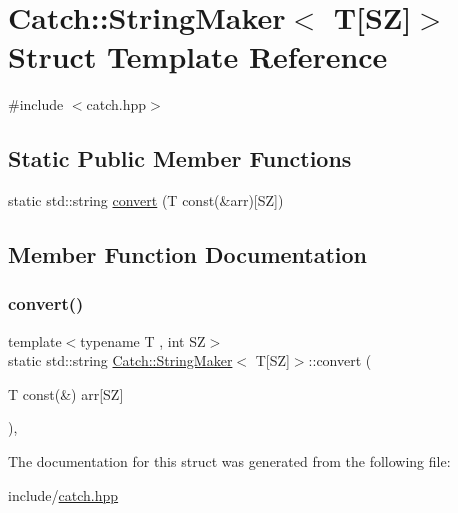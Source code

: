 \hypertarget{struct_catch_1_1_string_maker_3_01_t[_s_z]_4}{}\section{Catch\+::String\+Maker$<$ T\mbox{[}SZ\mbox{]}$>$ Struct Template Reference}
\label{struct_catch_1_1_string_maker_3_01_t[_s_z]_4}


{\ttfamily \#include $<$catch.\+hpp$>$}

\subsection*{Static Public Member Functions}
\begin{DoxyCompactItemize}
\item 
static std\+::string \mbox{\hyperlink{struct_catch_1_1_string_maker_3_01_t[_s_z]_4_a3698cea2c24d8649ec9ecb5fa679eeb7}{convert}} (T const(\&arr)\mbox{[}SZ\mbox{]})
\end{DoxyCompactItemize}


\subsection{Member Function Documentation}
\mbox{\label{struct_catch_1_1_string_maker_3_01_t[_s_z]_4_a3698cea2c24d8649ec9ecb5fa679eeb7}} 
\subsubsection{\texorpdfstring{convert()}{convert()}}
{\footnotesize\ttfamily template$<$typename T , int SZ$>$ \\
static std\+::string \mbox{\hyperlink{struct_catch_1_1_string_maker}{Catch\+::\+String\+Maker}}$<$ T\mbox{[}SZ\mbox{]}$>$\+::convert (\begin{DoxyParamCaption}\item[{T const(\&)}]{arr\mbox{[}\+S\+Z\mbox{]} }\end{DoxyParamCaption})\hspace{0.3cm}{\ttfamily [inline]}, {\ttfamily [static]}}



The documentation for this struct was generated from the following file\+:\begin{DoxyCompactItemize}
\item 
include/\mbox{\hyperlink{catch_8hpp}{catch.\+hpp}}\end{DoxyCompactItemize}
